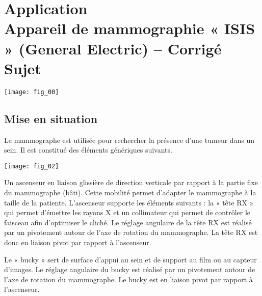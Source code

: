 \chapter*{Application  \\ 
Appareil de mammographie « ISIS » (General Electric) -- \ifprof Corrigé \else Sujet \fi}

\iflivret {} \else
\ifprof  {} \else \fi
\fi

\setcounter{question}{0}


\begin{marginfigure} [4cm]
\texttt{[image: fig\_00]}
\end{marginfigure}


\section*{Mise en situation}

\ifprof
\else

\ifcolle
\else
Le mammographe est utilisée pour rechercher la présence d’une tumeur dans un sein. Il est constitué des éléments génériques suivants.

\begin{center}
\texttt{[image: fig\_02]}
\end{center}


Un ascenseur en liaison glissière de direction verticale par rapport à la partie fixe du mammographe (bâti). Cette mobilité permet d’adapter le mammographe à la taille de la patiente. L’ascenseur supporte les éléments suivants : la « tête RX » qui permet d’émettre les rayons X et un collimateur qui permet de contrôler le faisceau afin d’optimiser le cliché. Le réglage angulaire de la tête RX est réalisé par un pivotement autour de l’axe de rotation du mammographe.
La tête RX est donc en liaison pivot par rapport à l’ascenseur.


Le « bucky » sert de surface d’appui au sein et de support au film ou au capteur
d’images. %
Le réglage angulaire du
bucky est réalisé par un pivotement autour de l’axe de rotation du mammographe.
Le bucky est en liaison pivot par rapport à l’ascenseur.

